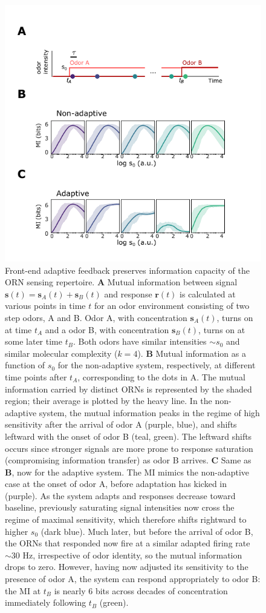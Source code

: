 \documentclass[10pt,prl,aps,showpacs,twocolumn,unsortedaddress,showkeys,linenumbers]{revtex4-1}
\begin{document}
\renewcommand\thefigure{\ref{fig:coding}--figure supplement 2}  




\begin{figure}
\centering
\includegraphics[width=0.8\linewidth]{figures/2_coding_representation_SI_2}
\caption{
Front-end adaptive feedback preserves information capacity of the ORN sensing repertoire. 
\textbf{A} 
Mutual information between signal $\mathbf s(t)=\mathbf s_A(t)+\mathbf s_B(t)$ and response $\mathbf r(t)$ is calculated at various points in time $t$ for an odor environment consisting of two step odors, A and B. Odor A, with concentration $\mathbf s_A(t)$, turns on at time $t_A$ and a odor B, with concentration $\mathbf s_B(t)$, turns on at some later time $t_B$. Both odors have similar intensities $\sim s_0$ and similar molecular complexity ($k = 4$). 
\textbf{B} Mutual information as a function of $s_0$ for the non-adaptive system, respectively, at different time points after $t_A$, corresponding to the dots in A. The mutual information carried by distinct ORNs is represented by the shaded region; their average is plotted by the heavy line. In the non-adaptive system, the mutual information peaks in the regime of high sensitivity after the arrival of odor A (purple, blue), and shifts leftward with the onset of odor B (teal, green). The leftward shifts occurs since stronger signals are more prone to response saturation (compromising information transfer) as odor B arrives. 
\textbf{C} Same as \textbf{B}, now for the adaptive system. The MI mimics the non-adaptive case at the onset of odor A, before adaptation has kicked in (purple). As the system adapts and responses decrease toward baseline, previously saturating signal intensities now cross the regime of maximal sensitivity, which therefore shifts rightward to higher $s_0$ (dark blue). Much later, but before the arrival of odor B, the ORNs that responded now fire at a similar  adapted firing rate $\sim 30$ Hz, irrespective of odor identity, so the mutual information drops to zero. However, having now adjusted its sensitivity to the presence of odor A, the system can respond appropriately to odor B: the MI at $t_B$ is nearly 6 bits across decades of concentration immediately following $t_B$ (green). 
}
\label{fig:SI_MI}
\end{figure}
\end{document}
